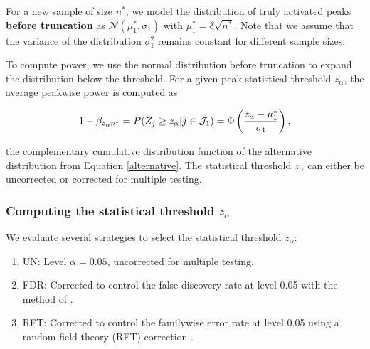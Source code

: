 For a new sample of size $n^*$, we model the distribution of truly activated peaks \textbf{before truncation} as $\mathcal{N}(\mu_1^*,\sigma_1)$ with $\mu_1^* = \delta\sqrt{n^*}$.
Note that we assume that the variance of the distribution $\sigma_1^2$ remains constant for different sample sizes.

{\color{Cyan}
To compute power, we use the normal distribution before truncation to expand the distribution below the threshold.
For a given peak statistical threshold $z_\alpha$, the average peakwise power is computed as

\begin{equation}
1-\beta_{z_\alpha n^*} = P(Z_j \geq z_\alpha | j \in {\cal J}_1) = \Phi\left( \frac{z_\alpha-\mu_1^*}{\sigma_1} \right), \label{predpower}
\end{equation}
}

the complementary cumulative distribution function of the alternative distribution from Equation \ref{alternative}. The statistical threshold $z_\alpha$ can either be uncorrected or corrected for multiple testing.

\subsubsection{Computing the statistical threshold $z_\alpha$ \label{threshold}}
We evaluate several strategies to select the statistical threshold $z_\alpha$:\begin{enumerate}
\item UN: Level $\alpha=0.05$, uncorrected for multiple testing.
\item FDR: Corrected to control the false discovery rate at level 0.05 with the method of \citet{Benjamini1995}.
\item RFT: Corrected to control the familywise error rate at level 0.05 using a random field theory (RFT) correction \citep{Friston2007}.
\end{enumerate}

